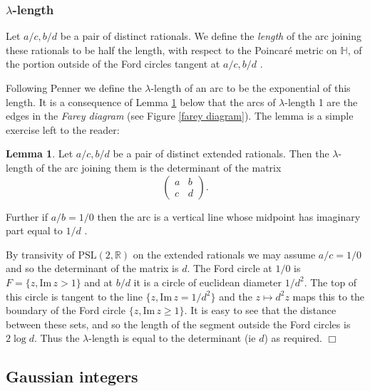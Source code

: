 \documentclass[12pt]{amsart}
\theoremstyle{plain}
\theoremstyle{definition}
\newtheorem{lem}[thm]{Lemma}
\def\HH{\mathbb{H}}
\def\im{\mathrm{Im}\,}
\def\RR{\mathbb{R}}
\def\slr{\mathrm{PSL}(2, \RR)}
\begin{document}
\subsubsection{$\lambda$-length}

Let $a/c, b/d$ be a pair of distinct rationals.
We define the \textit{length} of the arc 
joining these rationals 
to be half the length, with respect to the Poincaré metric on $\HH$, 
of the portion  outside of the Ford circles tangent at $a/c, b/d$ .


Following Penner \cite{bob} we define the
$\lambda$-length of an arc to be the exponential of this 
length.
 It is a consequence  of Lemma \ref{calcul} below  that the arcs of $\lambda$-length 1 are the edges in the 
\textit{Farey diagram} (see Figure \ref{farey diagram}).
The lemma  is a simple exercise left to the reader:

\begin{lem}\label{calcul}
Let $a/c, b/d$ be a pair of distinct extended rationals.
Then the  $\lambda$-length of the arc joining them
 is the determinant of the matrix
$$\begin{pmatrix}
a & b \\ c & d
\end{pmatrix}.$$

Further if $a/b = 1/0$ then the arc is a vertical line 
 whose midpoint has imaginary part equal to $1/d$ .
\end{lem}


\proof 
By transivity of $\slr$ on the extended rationals we may assume 
$a/c = 1/0$ and so the determinant of the matrix is $d$.
The Ford circle at $1/0$  is $F= \{ z, \im z > 1\}$ and
at $b/d$ it is a circle of euclidean diameter $1/d^2$.
The top of this circle is tangent to the line $\{ z, \im z = 1/d^2\}$
and the $z \mapsto d^2 z $ maps this to the boundary 
of the Ford circle $\{ z, \im z \geq 1\}$.
It is easy to see that the distance between these sets,
and so the length of the segment outside the Ford circles
is $2\log d$. Thus the $\lambda$-length is equal to the 
determinant (ie $d$) as required.
\hfill $\Box$



\subsection{Gaussian integers}
\end{document}
